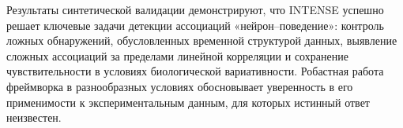 Результаты синтетической валидации демонстрируют, что INTENSE успешно решает ключевые
задачи детекции ассоциаций «нейрон--поведение»: контроль ложных обнаружений,
обусловленных временной структурой данных, выявление сложных ассоциаций за пределами линейной корреляции
и сохранение чувствительности в условиях биологической вариативности. Робастная
работа фреймворка в разнообразных условиях обосновывает уверенность в его применимости к экспериментальным данным, для которых истинный ответ неизвестен.

